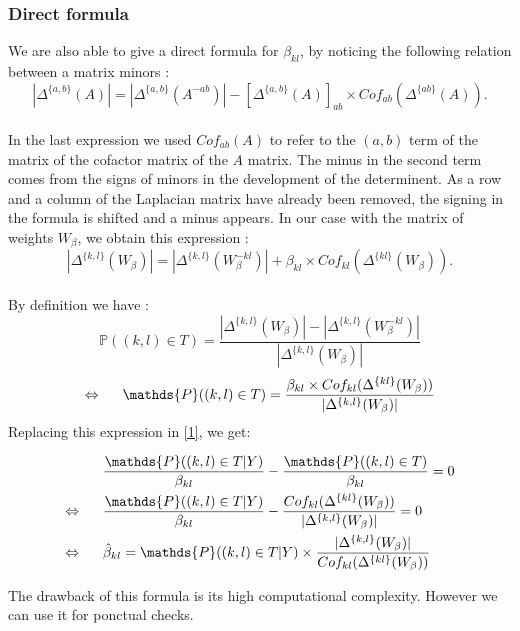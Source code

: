 \documentclass[a4paper,10pt]{article}
\begin{document}
 \subsubsection{Direct formula}
 We are also able to give a direct formula for $\beta_{kl}$, by noticing the following relation between a matrix minors :
 \[|\Delta^{\{a,b\}}(A)|=|\Delta^{\{a,b\}}(A^{- ab})| - [\Delta^{\{a,b\}}(A)]_{ab}\times Cof_{ab}(\Delta^{\{ab\}}(A)).\]\\
 In the last expression we used $Cof_{ab}(A)$ to refer to the $(a,b)$ term of the matrix of the cofactor matrix of the $A$ matrix. The minus in 
 the second term comes from the signs of minors in the development of the determinent. As a row and a column of the Laplacian matrix have
 already been removed, the signing in the formula is shifted and a minus appears. In our case with the matrix of weights $W_\beta$, we obtain this expression :
\[|\Delta^{\{k,l\}}(W_\beta)|=|\Delta^{\{k,l\}}(W_\beta^{- kl})| + \beta_{kl}\times Cof_{kl}(\Delta^{\{kl\}}(W_\beta)).\]\\

By definition we have :
\[\mathds{P}((k,l)\in T ) = \frac{|\Delta^{\{k,l\}}(W_\beta)|-|\Delta^{\{k,l\}}(W_\beta^{- kl})|}{|\Delta^{\{k,l\}}(W_\beta)|}\]
\[\Leftrightarrow  \text{\hspace{0.5cm}}\mathds{P}((k,l)\in T ) =\frac{\beta_{kl}\times Cof_{kl}(\Delta^{\{kl\}}(W_\beta))}{|\Delta^{\{k,l\}}(W_\beta)|}\]
Replacing this expression in \ref{1}, we get:

\begin{align*}
 &\frac{ \mathds{P}((k,l)\in T | Y)}{\beta_{kl}} -\frac{\mathds{P}((k,l)\in T)}{\beta_{kl}} =0 \\
 \Leftrightarrow \text{\hspace{0.5cm}}& \frac{ \mathds{P}((k,l)\in T | Y)}{\beta_{kl}} -\frac{Cof_{kl}(\Delta^{\{kl\}}(W_\beta))}{|\Delta^{\{k,l\}}(W_\beta)|}=0\\
 \Leftrightarrow \text{\hspace{0.5cm}}& \hat{\beta}_{kl} = \mathds{P}((k,l)\in T | Y) \times \frac{|\Delta^{\{k,l\}}(W_\beta)|}{Cof_{kl}(\Delta^{\{kl\}}(W_\beta))}
\end{align*}

The drawback of this formula is its high computational complexity. However we can use it for ponctual checks.
\end{document}
